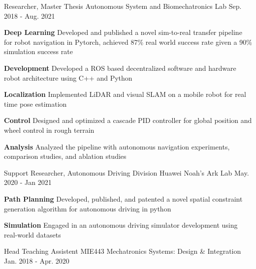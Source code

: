 \begin{cventries}
	\cventry
	{Researcher, Master Thesis}
	{Autonomous System and Biomechatronics Lab}
	{Sep. 2018 - Aug. 2021}
	{}
	{
		\begin{cvitems}
			\item {
				\textbf{Deep Learning} Developed and published a novel sim-to-real transfer pipeline for robot navigation in Pytorch, achieved 87\% real world success rate given a 90\% simulation success rate
			}
			\item {
				\textbf{Development} Developed a ROS based decentralized software and hardware robot architecture using C++ and Python
			}
			\item {
				\textbf{Localization} Implemented LiDAR and visual SLAM on a mobile robot for real time pose estimation
			}
			\item {
				\textbf{Control} Designed and optimized a cascade PID controller for global position and wheel control in rough terrain
			}
			\item {
				\textbf{Analysis} Analyzed the pipeline with autonomous navigation experiments, comparison studies, and ablation studies
			}
		\end{cvitems}
	}
	\cventry
	{Support Researcher, Autonomous Driving Division}
	{Huawei Noah’s Ark Lab}
	{May. 2020 - Jan 2021}
	{}
	{
		\begin{cvitems}
			\item {
				\textbf{Path Planning} Developed, published, and patented a novel spatial constraint generation algorithm for autonomous driving in python
			}
			\item {
				\textbf{Simulation} Engaged in an autonomous driving simulator development using real-world datasets
			}
		\end{cvitems}
	}
	\cventry
	{Head Teaching Assistent}
	{MIE443 Mechatronics Systems: Design \& Integration}
	{Jan. 2018 - Apr. 2020}

\end{cventries}
